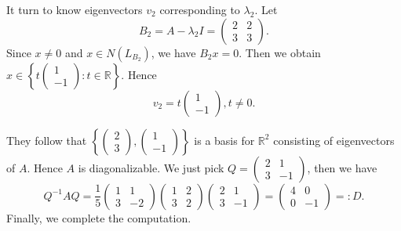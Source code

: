 \begin{Exercise}
\begin{enumerate}[(a)]
\begin{solution}
It turn to know eigenvectors $v_2$ corresponding to $\lambda_2$. Let
$$
B_2 = A-\lambda_2 I = \begin{pmatrix}
2 & 2 \\
3 & 3
\end{pmatrix}.
$$ 
Since $x\neq 0$ and $x\in N(L_{B_2})$, we have $B_2 x = 0$. Then we obtain $x \in \left\{t\begin{pmatrix}
1 \\
-1
\end{pmatrix}:t\in\mathbb{R}\right\}$. Hence
$$
v_2 = t\begin{pmatrix}
1 \\
-1
\end{pmatrix}, t\neq 0.
$$

They follow that $\left\{\begin{pmatrix}
2 \\
3
\end{pmatrix},\begin{pmatrix}
1 \\
-1
\end{pmatrix}\right\}
$ is a basis for $\mathbb{R}^2$ consisting of eigenvectors of $A$. Hence $A$ is diagonalizable. We just pick $Q = \begin{pmatrix}
2 & 1 \\
3 & -1
\end{pmatrix}$, then we have
$$
Q^{-1} A Q = \frac{1}{5}\begin{pmatrix}
1 & 1 \\
3 & -2
\end{pmatrix}\begin{pmatrix}
1 & 2 \\
3 & 2
\end{pmatrix}\begin{pmatrix}
2 & 1 \\
3 & -1
\end{pmatrix} = \begin{pmatrix}
4 & 0 \\
0 & -1
\end{pmatrix} =: D.
$$
Finally, we complete the computation.
\end{solution}
\end{enumerate}
\end{Exercise}